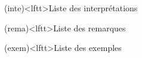 \documentclass[../../main/main.tex]{subfiles}
\begin{document}
\begin{boxes}
\begin{tcb}
	\end{tcb}
	\begin{tcb}(inte)<lftt>{Liste des interprétations}
	\end{tcb}
	\begin{tcb}(rema)<lftt>{Liste des remarques}
	\end{tcb}
	\begin{tcb}(exem)<lftt>{Liste des exemples}
	\end{tcb}

\end{boxes}
\end{document}

